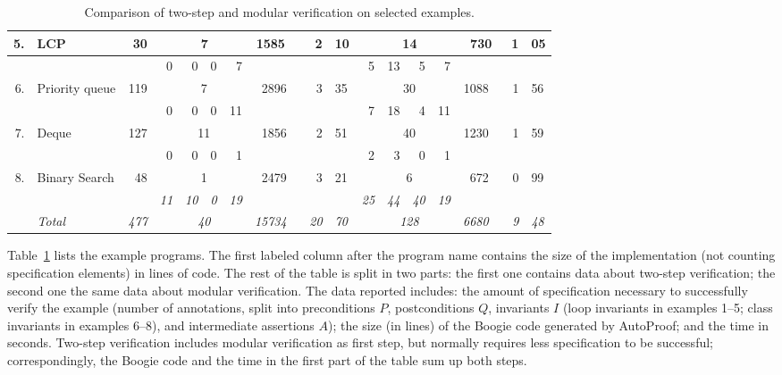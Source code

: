 \begin{table}[ht]
\begin{tabular}{ r l r| rrrr r r@{.}l | rrrr r r@{.}l |}
5. & LCP  & 30 & \multicolumn{4}{c}{\ 7} & 1585 \ & 2&10 & \multicolumn{4}{c}{\ 14} & 730\ & 1&05 \\
\hline
   &          &    &  {\scriptsize 0} & {\scriptsize 0} & {\scriptsize 0} & {\scriptsize 7}   & \multicolumn{3}{c|}{} &  {\scriptsize 5} & {\scriptsize 13} & {\scriptsize 5} & {\scriptsize 7} & \multicolumn{3}{c|}{} \\[-3pt]
6. & Priority queue & 119 & \multicolumn{4}{c}{\ 7} & 2896 \ & 3&35 & \multicolumn{4}{c}{\ 30} & 1088 \ & 1&56 \\
   &          &    &  {\scriptsize 0} & {\scriptsize 0} & {\scriptsize 0} & {\scriptsize 11}   & \multicolumn{3}{c|}{} &  {\scriptsize 7} & {\scriptsize 18} & {\scriptsize 4} & {\scriptsize 11} & \multicolumn{3}{c|}{} \\[-3pt]
7. & Deque & 127 & \multicolumn{4}{c}{\ 11} & 1856 \ & 2&51 & \multicolumn{4}{c}{\ 40} & 1230 \ & 1&59 \\
   &          &    &  {\scriptsize 0} & {\scriptsize 0} & {\scriptsize 0} & {\scriptsize 1}   & \multicolumn{3}{c|}{} &  {\scriptsize 2} & {\scriptsize 3} & {\scriptsize 0} & {\scriptsize 1} & \multicolumn{3}{c|}{} \\[-3pt]
8. & Binary Search  & 48 & \multicolumn{4}{c}{\ 1} & 2479 \ & 3&21 & \multicolumn{4}{c}{\ 6} & 672 \ & 0&99 \\
\hline \hline
   &          &    &  {\scriptsize \textit{11}} & {\scriptsize \textit{10}} & {\scriptsize \textit{0}} & {\scriptsize \textit{19}}   & \multicolumn{3}{c|}{} &  {\scriptsize \textit{25}} & {\scriptsize \textit{44}} & {\scriptsize \textit{40}} & {\scriptsize \textit{19}} & \multicolumn{3}{c|}{} \\[-3pt]
& \textit{Total} & \textit{477} & \multicolumn{4}{c}{\ \textit{40}} & \textit{15734} \ & \textit{20}&\textit{70} & \multicolumn{4}{c}{\ \textit{128}} & \textit{6680} \ & \textit{9}&\textit{48}
\end{tabular}
\caption{Comparison of two-step and modular verification on selected examples.}
\label{tab:two-step:examples}
\end{table}


Table~\ref{tab:two-step:examples} lists the example programs.
The first labeled column after the program name contains the size of the implementation (not counting specification elements) in lines of code.
The rest of the table is split in two parts: the first one contains data about two-step verification; the second one the same data about modular verification.
The data reported includes: the amount of specification necessary to successfully verify the example (number of annotations, split into preconditions $P$, postconditions $Q$, invariants $I$ (loop invariants in examples 1--5; class invariants in examples 6--8), and intermediate assertions $A$); the size (in lines) of the Boogie code generated by AutoProof; and the time in seconds.
Two-step verification includes modular verification as first step, but normally requires less specification to be successful; correspondingly, the Boogie code and the time in the first part of the table sum up both steps.
 


